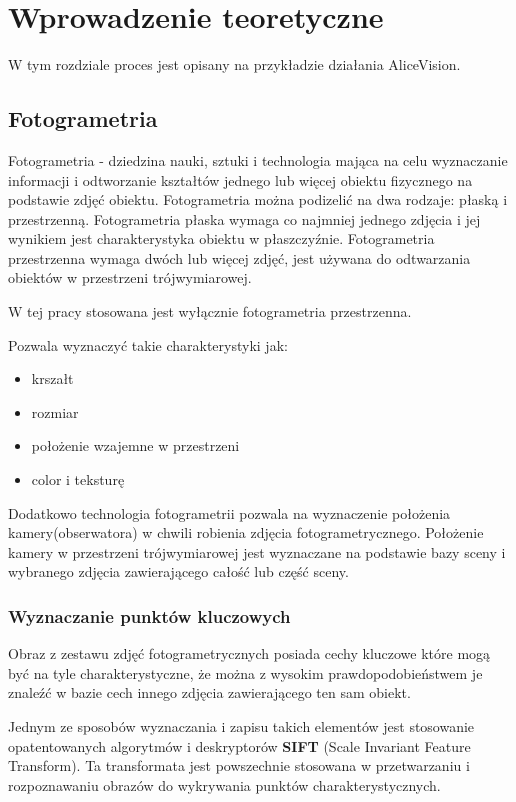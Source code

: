 \graphicspath{ {./img/2_Theory/} }


\chapter{Wprowadzenie teoretyczne}
W tym rozdziale proces jest opisany na przykładzie działania AliceVision.
\section{Fotogrametria}
Fotogrametria - dziedzina nauki, sztuki i technologia mająca na celu wyznaczanie informacji i odtworzanie kształtów jednego lub więcej obiektu fizycznego na podstawie zdjęć obiektu.
Fotogrametria można podizelić na dwa rodzaje: płaską i przestrzenną. Fotogrametria płaska wymaga co najmniej jednego zdjęcia i jej wynikiem jest charakterystyka obiektu w płaszczyźnie. Fotogrametria przestrzenna wymaga dwóch lub więcej zdjęć, jest używana do odtwarzania obiektów w przestrzeni trójwymiarowej.

W tej pracy stosowana jest wyłącznie fotogrametria przestrzenna.

Pozwala wyznaczyć takie charakterystyki jak:
\begin{itemize}
   \item krszałt
   \item rozmiar
   \item położenie wzajemne w przestrzeni
   \item color i teksturę
\end{itemize}

Dodatkowo technologia fotogrametrii pozwala na wyznaczenie położenia kamery(obserwatora) w chwili robienia zdjęcia fotogrametrycznego.
Położenie kamery w przestrzeni trójwymiarowej jest wyznaczane na podstawie bazy sceny i wybranego zdjęcia zawierającego całość lub część sceny.

\subsection{Wyznaczanie punktów kluczowych}
Obraz z zestawu zdjęć fotogrametrycznych posiada cechy kluczowe które mogą być na tyle charakterystyczne, że można z wysokim prawdopodobieństwem je znaleźć w bazie cech innego zdjęcia zawierającego ten sam obiekt.

Jednym ze sposobów wyznaczania i zapisu takich elementów jest stosowanie opatentowanych algorytmów i deskryptorów \textbf{SIFT} (Scale Invariant Feature Transform). Ta transformata jest powszechnie stosowana w przetwarzaniu i rozpoznawaniu obrazów do wykrywania punktów charakterystycznych.

